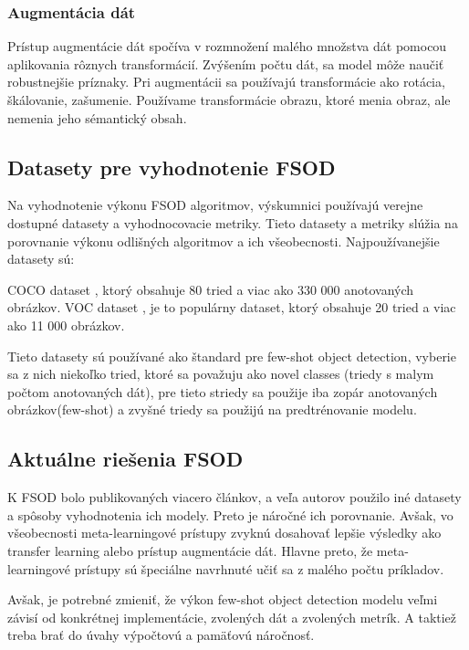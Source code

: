 \subsubsection{Augmentácia dát}
\hspace{\parindent}Prístup augmentácie dát spočíva v rozmnožení malého množstva dát pomocou aplikovania rôznych transformácií. Zvýšením počtu dát, sa model môže naučiť robustnejšie príznaky. Pri augmentácii sa používajú transformácie ako rotácia, škálovanie, zašumenie. Používame transformácie obrazu, ktoré menia obraz, ale nemenia jeho sémantický obsah.

\subsection{Datasety pre vyhodnotenie FSOD}
\hspace{\parindent}Na vyhodnotenie výkonu FSOD algoritmov, výskumnici používajú verejne dostupné datasety a vyhodnocovacie metriky. Tieto datasety a metriky slúžia na porovnanie výkonu odlišných algoritmov a ich všeobecnosti. Najpoužívanejšie datasety sú: 

COCO dataset \cite{COCO}, ktorý obsahuje 80 tried a viac ako 330 000 anotovaných obrázkov. VOC dataset \cite{VOC}, je to populárny dataset, ktorý obsahuje 20 tried a viac ako 11 000 obrázkov. 

Tieto datasety sú používané ako štandard pre few-shot object detection, vyberie sa z nich niekoľko tried, ktoré sa považuju ako novel classes (triedy s malym počtom anotovaných dát), pre tieto striedy sa použije iba zopár anotovaných obrázkov(few-shot) a zvyšné triedy sa použijú na predtrénovanie modelu. 

\subsection{Aktuálne riešenia FSOD}
\hspace{\parindent}K FSOD bolo publikovaných viacero článkov, a veľa autorov použilo iné datasety a spôsoby vyhodnotenia ich modely. Preto je náročné ich porovnanie. Avšak, vo všeobecnosti meta-learningové prístupy zvyknú dosahovať lepšie výsledky ako transfer learning alebo prístup augmentácie dát. Hlavne preto, že meta-learningové prístupy sú špeciálne navrhnuté učiť sa z malého počtu príkladov. 

Avšak, je potrebné zmieniť, že výkon few-shot object detection modelu veľmi závisí od konkrétnej implementácie, zvolených dát a zvolených metrík. A taktiež treba brať do úvahy výpočtovú a pamäťovú náročnosť. 


